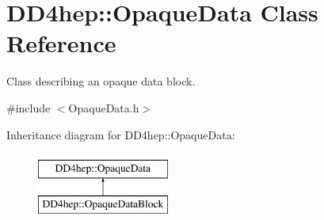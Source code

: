 \hypertarget{class_d_d4hep_1_1_opaque_data}{}\section{D\+D4hep\+:\+:Opaque\+Data Class Reference}
\label{class_d_d4hep_1_1_opaque_data}


Class describing an opaque data block.  




{\ttfamily \#include $<$Opaque\+Data.\+h$>$}

Inheritance diagram for D\+D4hep\+:\+:Opaque\+Data\+:\begin{figure}[H]
\begin{center}
\leavevmode
\includegraphics[height=2.000000cm]{class_d_d4hep_1_1_opaque_data}
\end{center}
\end{figure}
